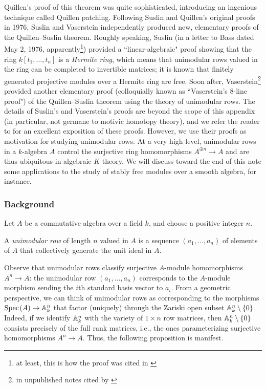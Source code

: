 Quillen's proof of this theorem was quite sophisticated, introducing an ingenious technique called Quillen patching. Following Suslin and Quillen's original proofs in 1976, Suslin and Vaserstein independently produced new, elementary proofs of the Quillen--Suslin theorem. Roughly speaking, Suslin (in a letter to Bass dated May 2, 1976, apparently\footnote{at least, this is how the proof was cited in \cite[Chapter III]{Lam_Serre_Problem}}) provided a ``linear-algebraic" proof showing that the ring $k[t_1,\ldots,t_n]$ is a \textit{Hermite ring}, which means that unimodular rows valued in the ring can be completed to invertible matrices; it is known that finitely generated projective modules over a Hermite ring are free. Soon after, Vaserstein\footnote{in unpublished notes cited by \cite[Chapter III]{Lam_Serre_Problem}} provided another elementary proof (colloquially known as ``Vaserstein’s 8-line proof") of the Quillen--Suslin theorem using the theory of unimodular rows. The details of Suslin's and Vaserstein's proofs are beyond the scope of this appendix (in particular, not germane to motivic homotopy theory), and we refer the reader to \cite[Chapter III]{Lam_Serre_Problem} for an excellent exposition of these proofs. However, we use their proofs as motivation for studying unimodular rows. At a very high level, unimodular rows in a $k$-algebra $A$ control the surjective ring homomorphisms $A^{\oplus n} \to A$ and are thus ubiquitous in algebraic $K$-theory. We will discuss toward the end of this note some applications to the study of stably free modules over a smooth algebra, for instance.

\subsubsection{Background} 

Let $A$ be a commutative algebra over a field $k$, and choose a positive integer $n$. 

\begin{definition}
    A \textit{unimodular row} of length $n$ valued in $A$ is a sequence $(a_1,\ldots,a_n)$ of elements of $A$ that collectively generate the unit ideal in $A$.
\end{definition}

 Observe that unimodular rows classify surjective $A$-module homomorphisms $A^n \to A$: the unimodular row $(a_1,\ldots,a_n)$ corresponds to the $A$-module morphism sending the $i$th standard basis vector to $a_i$. From a geometric perspective, we can think of unimodular rows as corresponding to the morphisms $\text{Spec}\hspace{0.1em}(A) \to \mathbb{A}^n_k$ that factor (uniquely) through the Zariski open subset $\mathbb{A}^n_k\setminus\{0\}$. Indeed, if we identify $\mathbb{A}^n_k$ with the variety of $1 \times n$ row matrices, then $\mathbb{A}^n_k\setminus\{0\}$ consists precisely of the full rank matrices, i.e., the ones parameterizing surjective homomorphisms $A^n \to A$. Thus, the following proposition is manifest.

